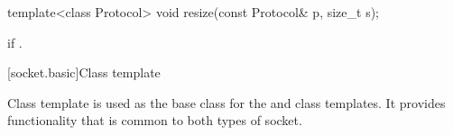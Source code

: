 \begin{itemdecl}
template<class Protocol> void resize(const Protocol& p, size_t s);
\end{itemdecl}

\begin{itemdescr}
\pnum
\remarks {} if .
\end{itemdescr}




[socket.basic]{Class template }

\pnum
Class template  is used as the base class for the  and  class templates. It provides functionality that is common to both types of socket.

